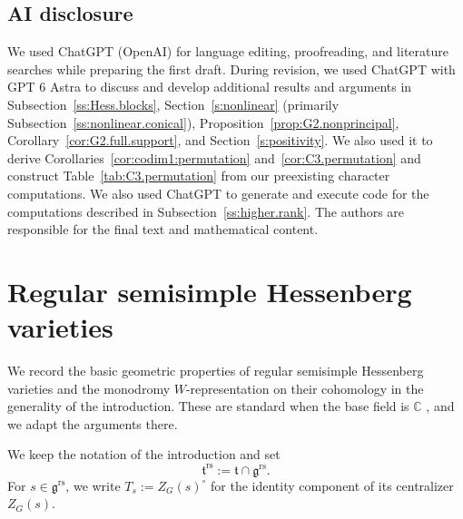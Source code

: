 \documentclass[11pt]{amsart}
\numberwithin{equation}{section}
\theoremstyle{definition}
\newcommand\grs{\mathfrak{g}^{\mathrm{rs}}}
\def\C{\mathbb{C}}
\def\ft{\mathfrak {t}}
\begin{document}
\subsection*{AI disclosure}
We used ChatGPT (OpenAI) for language editing,
proofreading, and literature searches while preparing
the first draft.
During revision, we used ChatGPT with GPT 6 Astra
to discuss and develop additional results and arguments
in Subsection~\ref{ss:Hess.blocks},
Section~\ref{s:nonlinear}
(primarily Subsection~\ref{ss:nonlinear.conical}),
Proposition~\ref{prop:G2.nonprincipal}, Corollary~\ref{cor:G2.full.support},
and Section~\ref{s:positivity}.
We also used it to derive
Corollaries~\ref{cor:codim1:permutation}
and~\ref{cor:C3.permutation}
and construct Table~\ref{tab:C3.permutation}
from our preexisting character computations.
We also used ChatGPT to generate and execute code
for the computations described in
Subsection~\ref{ss:higher.rank}.
The authors are responsible for the final text
and mathematical content.

\renewcommand{\thetheorem}{\thesection.\arabic{theorem}}
\section{Regular semisimple Hessenberg varieties} \label{s:rs.Hess}


We record the basic geometric properties of regular semisimple Hessenberg varieties and the monodromy $W$-representation on their cohomology in the generality of the introduction.
These are standard when the base field is $\C$ \cite{demari-procesi-shayman,BrCh18,balibanu-crooks}, and we adapt the arguments there.

We keep the notation of the introduction and set
\[\ft^{\mathrm{rs}}:=\ft\cap\grs.\]
For $s\in \grs$, we write $T_s:=Z_G(s)^\circ$ for the identity component of its centralizer $Z_G(s)$.
\end{document}
